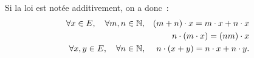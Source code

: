 \documentclass{magnolia}
\begin{document}
\begin{remarqueUnique}
\remarque Si la loi est notée additivement, on a donc~:
  \begin{eqnarray*}
  \forall x\in E,\quad \forall m,n\in\mathbb{N}, & & (m+n)\cdot x=m\cdot x+n\cdot x\\
                                        & & n\cdot(m\cdot x)=(nm)\cdot x\\
  \forall x,y\in E,\quad \forall n\in\mathbb{N}, & & n\cdot(x+y)=n\cdot x+n\cdot y.
  \end{eqnarray*}
\end{remarqueUnique}
\end{document}
